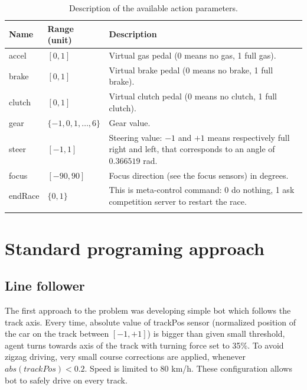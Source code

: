 \documentclass[declaration,shortabstract,english,inz]{iithesis}
\begin{document}
\begin{center}
\end{center}

\begin{center}
    \begin{longtable}{ | p{} |p{}| p{} |}
    \hline
    \textbf{Name} & \textbf{Range (unit)} & \textbf{Description}  \\ 
    \hline
    accel & $[0,1]$ & Virtual gas pedal (0 means no gas, 1 full gas). \\ 
     \hline
     brake &  $[0,1]$ & Virtual brake pedal (0 means no brake, 1 full brake). \\ 
     \hline
     clutch &  $[0,1]$ & Virtual clutch pedal (0 means no clutch, 1 full clutch). \\ 
     \hline
     gear & $\{-1,0,1,\dots ,6\}$ & Gear value. \\ 
     \hline
     steer &  $[-1,1]$ & Steering value: $-1$ and $+1$ means respectively full right and
     left, that corresponds to an angle of $0.366519$ rad. \\ 
     \hline
     focus &  $[-90,90]$ & Focus direction (see the focus sensors) in degrees. \\ 
     \hline
     endRace &  $\{0,1\}$ & This is meta-control command: 0 do nothing, 1 ask competition
     server to restart the race. \\ 
     \hline
     \caption{\label{tab:torcs_actions}Description of the available  action parameters.}
    \end{longtable}
\end{center}

\chapter{Standard programing approach}

\section{Line follower}

The first approach to the problem was developing simple bot which follows the track axis. Every time, absolute value of trackPos sensor (normalized position of the car on the track between $[-1, +1]$) is bigger than given small threshold, agent turns towards axis of the track with turning force set to 35\%. To avoid zigzag driving, very small course corrections are applied, whenever $abs(trackPos) < 0.2$. Speed is limited to 80 km/h. These configuration allows bot to safely drive on every track. 
\end{document}
